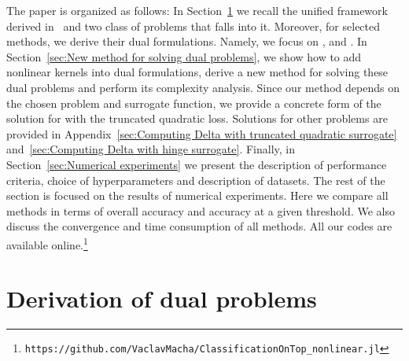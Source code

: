 The paper is organized as follows: In Section~\ref{sec:Derivation of dual problems} we recall the unified framework derived in~\cite{adam2019patmat} and two class of problems that falls into it. Moreover, for selected methods, we derive their dual formulations. Namely, we focus on \TopPush, \TopPushK and \PatMat. In Section~\ref{sec:New method for solving dual problems}, we show how to add nonlinear kernels into dual formulations, derive a new method for solving these dual problems and perform its complexity analysis. Since our method depends on the chosen problem and surrogate function, we provide a concrete form of the solution for \TopPushK with the truncated quadratic loss. Solutions for other problems are provided in Appendix~\ref{sec:Computing Delta with truncated quadratic surrogate} and~\ref{sec:Computing Delta with hinge surrogate}. Finally, in Section~\ref{sec:Numerical experiments} we present the description of performance criteria, choice of hyperparameters and description of datasets. The rest of the section is focused on the results of numerical experiments. Here we compare all methods in terms of overall accuracy and accuracy at a given threshold. We also discuss the convergence and time consumption of all methods. All our codes are available online.\footnote{\texttt{https://github.com/VaclavMacha/ClassificationOnTop\_nonlinear.jl}}

\section{Derivation of dual problems}\label{sec:Derivation of dual problems}

